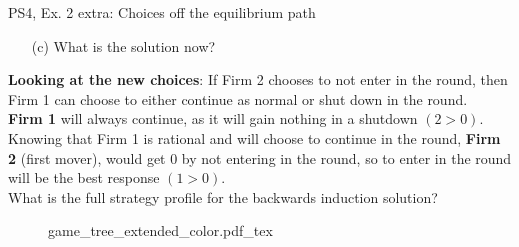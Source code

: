 \begin{frame}{PS4, Ex. 2 extra: Choices off the equilibrium path}
  \begin{multicols}{2}
    \begin{itemize}
      \item[(c)] What is the solution now?
    \end{itemize}
    \textbf{Looking at the new choices}: If Firm 2 chooses to not enter in the  round, then Firm 1 can choose to either continue as normal or shut down in the  round.\\\medskip
    \textbf{Firm 1} will always continue, as it will gain nothing in a shutdown $(2>0)$.\\\medskip
    Knowing that Firm 1 is rational and will choose to continue in the  round, \textbf{Firm 2} (first mover), would get 0 by not entering in the  round, so to enter in the  round will be the best response $(1>0)$.\\\medskip
    What is the full strategy profile for the backwards induction solution?
  \vfill\null \columnbreak
    \begin{figure}[!h]
      \begin{center}
      \def\svgwidth{1.0\columnwidth}
      {game_tree_extended_color.pdf_tex}
      \end{center}
    \end{figure}
  \vfill\null
  \end{multicols}
\end{frame}

